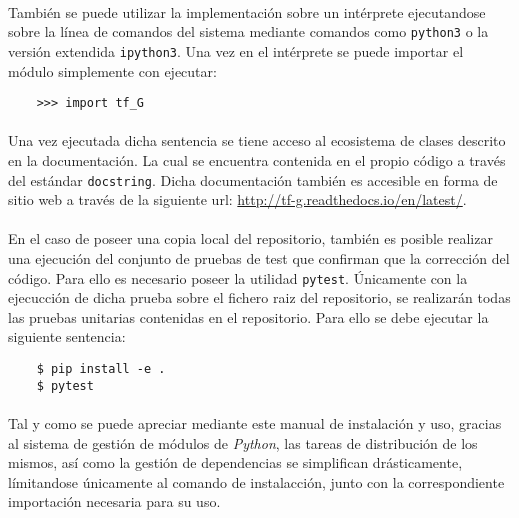 \documentclass{subfiles}
\begin{document}
    \paragraph{}
    También se puede utilizar la implementación sobre un intérprete ejecutandose sobre la línea de comandos del sistema mediante comandos como \texttt{python3} o la versión extendida \texttt{ipython3}. Una vez en el intérprete se puede importar el módulo simplemente con ejecutar:

    \begin{verbatim}
    >>> import tf_G
    \end{verbatim}

    \paragraph{}
    Una vez ejecutada dicha sentencia se tiene acceso al ecosistema de clases descrito en la documentación. La cual se encuentra contenida en el propio código a través del estándar \texttt{docstring}. Dicha documentación también es accesible en forma de sitio web a través de la siguiente url: \url{http://tf-g.readthedocs.io/en/latest/}.

    \paragraph{}
    En el caso de poseer una copia local del repositorio, también es posible realizar una ejecución del conjunto de pruebas de test que confirman que la corrección del código. Para ello es necesario poseer la utilidad \texttt{pytest}. Únicamente con la ejecucción de dicha prueba sobre el fichero raiz del repositorio, se realizarán todas las pruebas unitarias contenidas en el repositorio. Para ello se debe ejecutar la siguiente sentencia:

    \begin{verbatim}
    $ pip install -e .
    $ pytest
    \end{verbatim}

    \paragraph{}
    Tal y como se puede apreciar mediante este manual de instalación y uso, gracias al sistema de gestión de módulos de \emph{Python}, las tareas de distribución de los mismos, así como la gestión de dependencias se simplifican drásticamente, límitandose únicamente al comando de instalacción, junto con la correspondiente importación necesaria para su uso.
\end{document}

